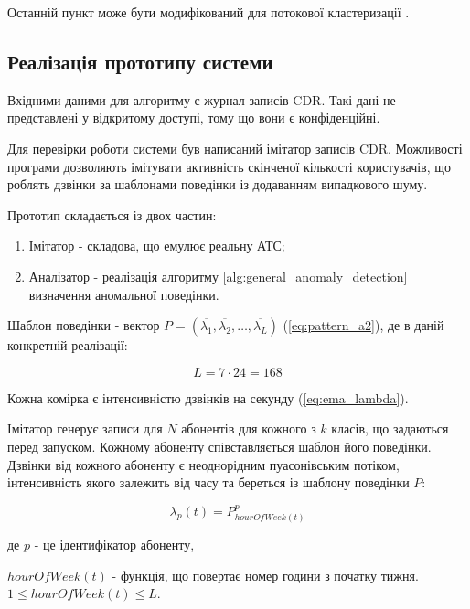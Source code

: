 Останній пункт може бути модифікований для потокової кластеризації \cite{dasgupta2008clustering}.


\subsection{Реалізація прототипу системи}
\label{poc-implementing}
Вхідними даними для алгоритму є журнал записів CDR. Такі дані не представлені у відкритому доступі, тому що вони є конфіденційні.

Для перевірки роботи системи був написаний імітатор записів CDR. Можливості програми дозволяють імітувати активність скінченої кількості користувачів, що роблять дзвінки за шаблонами поведінки із додаванням випадкового шуму.

Прототип складається із двох частин:
\begin{enumerate}
\item Імітатор - складова, що емулює реальну АТС;
\item Аналізатор - реалізація алгоритму \ref{alg:general_anomaly_detection} визначення аномальної поведінки.
\end{enumerate}

Шаблон поведінки - вектор $P = (\overline{\lambda_1}, \overline{\lambda_2}, \dots, \overline{\lambda_L})$ (\ref{eq:pattern_a2}), де в даній конкретній реалізації:

\begin{equation}\label{eq:l_count}L = 7 \cdot 24 = 168 \end{equation}

Кожна комірка є інтенсивністю дзвінків на секунду (\ref{eq:ema_lambda}).

Імітатор генерує записи для $N$ абонентів для кожного з $k$ класів, що задаються перед запуском. Кожному абоненту співставляється шаблон його поведінки. Дзвінки від кожного абоненту є неоднорідним пуасонівським потіком, інтенсивність якого залежить від часу та береться із шаблону поведінки $P$:

\begin{equation}\label{eq:puasson}\lambda_p(t) = P^p_{hourOfWeek(t)} \end{equation}

\begin{ESKDexplanation}
  \item де $p$ - це ідентифікатор абоненту,
  \item $hourOfWeek(t)$ - функція, що повертає номер години з початку тижня. $1 \le hourOfWeek(t) \le L$.
\end{ESKDexplanation}

